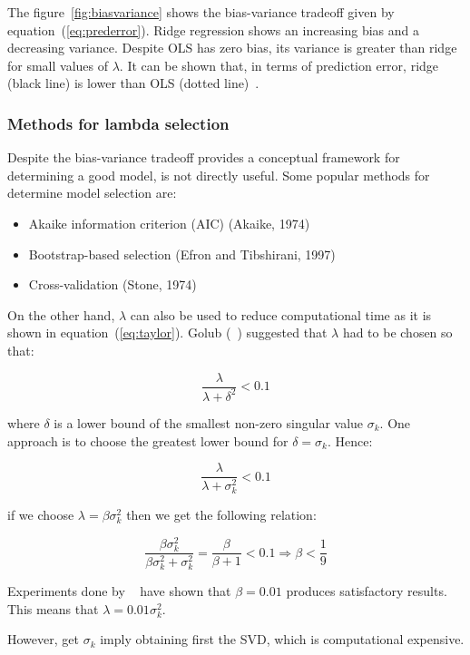 The figure~\ref{fig:biasvariance} shows the bias-variance tradeoff
given by equation~(\ref{eq:prederror}). Ridge regression shows an
increasing bias and a decreasing variance. Despite OLS has zero bias,
its variance is greater than ridge for small values of $\lambda$.
It can be shown that, in terms of prediction error, ridge (black line)
is lower than OLS (dotted line)~\cite{hoerl1970}.



\subsubsection{Methods for lambda selection}

Despite the bias-variance tradeoff provides a conceptual framework for
determining a good model, is not directly useful. Some popular methods
for determine model selection are:

\begin{itemize}
    \item Akaike information criterion (AIC) (Akaike, 1974)
    \item Bootstrap-based selection (Efron and Tibshirani, 1997)
    \item Cross-validation (Stone, 1974)
\end{itemize}

On the other hand, $\lambda$ can also be used to reduce computational time as it
is shown in equation~(\ref{eq:taylor}). Golub (~\cite{golub1965}) suggested that
$\lambda$ had to be chosen so that:

\[
\frac{\lambda}{\lambda + \delta^2} < 0.1
\]

\noindent where $\delta$ is a lower bound of the smallest non-zero singular
value $\sigma_k$. One approach is to choose the greatest lower bound for
$\delta=\sigma_k$. Hence:

\[
\frac{\lambda}{\lambda + \sigma_k^2} < 0.1
\]

\noindent if we choose $\lambda=\beta \sigma_k^2$ then we get the following
relation:


\[
\frac{\beta \sigma_k^2}{\beta \sigma_k^2 + \sigma_k^2} =
\frac{\beta}{\beta+1} < 0.1 \Rightarrow \beta < \frac{1}{9}  
\]

Experiments done by ~\cite{coleman+sun2010} have shown that $\beta = 0.01$
produces satisfactory results. This means that $\lambda = 0.01 \sigma_k^2$.

However, get $\sigma_k$ imply obtaining first the SVD, which is
computational expensive.

